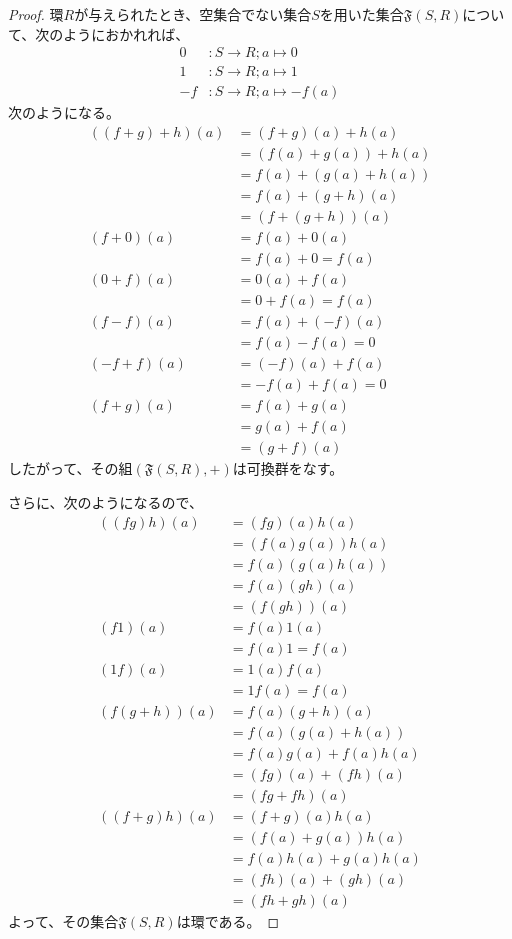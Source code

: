\documentclass[dvipdfmx]{jsarticle}
\begin{document}
\begin{proof}
環$R$が与えられたとき、空集合でない集合$S$を用いた集合$\mathfrak{F}(S,R)$について、次のようにおかれれば、
\begin{align*}
0&:S \rightarrow R;a \mapsto 0\\
1&:S \rightarrow R;a \mapsto 1\\
- f&:S \rightarrow R;a \mapsto - f(a)
\end{align*}
次のようになる。
\begin{align*}
\left( (f + g) + h \right)(a) &= (f + g)(a) + h(a)\\
&= \left( f(a) + g(a) \right) + h(a)\\
&= f(a) + \left( g(a) + h(a) \right)\\
&= f(a) + (g + h)(a)\\
&= \left( f + (g + h) \right)(a)\\
(f + 0)(a) &= f(a) + 0(a)\\
&= f(a) + 0 = f(a)\\
(0 + f)(a) &= 0(a) + f(a)\\
&= 0 + f(a) = f(a)\\
(f - f)(a) &= f(a) + ( - f)(a)\\
&= f(a) - f(a) = 0\\
( - f + f)(a) &= ( - f)(a) + f(a)\\
&= - f(a) + f(a) = 0\\
(f + g)(a) &= f(a) + g(a)\\
&= g(a) + f(a)\\
&= (g + f)(a)
\end{align*}
したがって、その組$\left( \mathfrak{F}(S,R), + \right)$は可換群をなす。\par
さらに、次のようになるので、
\begin{align*}
\left( (fg)h \right)(a) &= (fg)(a)h(a)\\
&= \left( f(a)g(a) \right)h(a)\\
&= f(a)\left( g(a)h(a) \right)\\
&= f(a)(gh)(a)\\
&= \left( f(gh) \right)(a)\\
(f1)(a) &= f(a)1(a)\\
&= f(a)1 = f(a)\\
(1f)(a) &= 1(a)f(a)\\
&= 1f(a) = f(a)\\
\left( f(g + h) \right)(a) &= f(a)(g + h)(a)\\
&= f(a)\left( g(a) + h(a) \right)\\
&= f(a)g(a) + f(a)h(a)\\
&= (fg)(a) + (fh)(a)\\
&= (fg + fh)(a)\\
\left( (f + g)h \right)(a) &= (f + g)(a)h(a)\\
&= \left( f(a) + g(a) \right)h(a)\\
&= f(a)h(a) + g(a)h(a)\\
&= (fh)(a) + (gh)(a)\\
&= (fh + gh)(a)
\end{align*}
よって、その集合$\mathfrak{F}(S,R)$は環である。
\end{proof}
\end{document}
